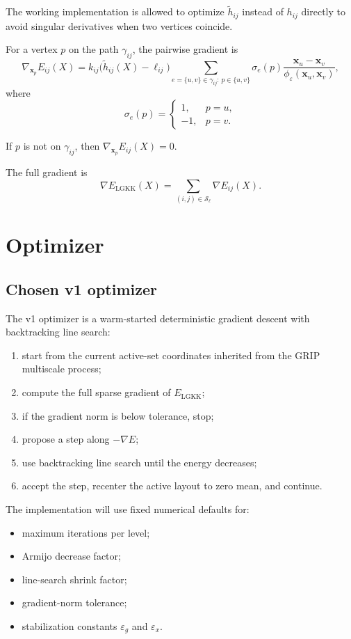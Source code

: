 \documentclass[11pt]{article}
\newcommand{\vect}[1]{\mathbf{#1}}
\begin{document}
The working implementation is allowed to optimize $\tilde{h}_{ij}$ instead of
$h_{ij}$ directly to avoid singular derivatives when two vertices coincide.

For a vertex $p$ on the path $\gamma_{ij}$, the pairwise gradient is
\[
\nabla_{\vect{x}_p} E_{ij}(X)
=
k_{ij}\bigl(\tilde{h}_{ij}(X)-\ell_{ij}\bigr)
\sum_{e=\{u,v\}\in\gamma_{ij}:\,p\in\{u,v\}}
\sigma_e(p)\frac{\vect{x}_u-\vect{x}_v}
{\phi_\varepsilon(\vect{x}_u,\vect{x}_v)},
\]
where
\[
\sigma_e(p)=
\begin{cases}
1, & p=u,\\
-1, & p=v.
\end{cases}
\]

If $p$ is not on $\gamma_{ij}$, then $\nabla_{\vect{x}_p}E_{ij}(X)=0$.

The full gradient is
\[
\nabla E_{\mathrm{LGKK}}(X)
=
\sum_{(i,j)\in\mathcal{S}_\ell} \nabla E_{ij}(X).
\]

\section{Optimizer}

\subsection{Chosen v1 optimizer}

The v1 optimizer is a warm-started deterministic gradient descent with
backtracking line search:
\begin{enumerate}[leftmargin=1.8em]
  \item start from the current active-set coordinates inherited from the GRIP
    multiscale process;
  \item compute the full sparse gradient of $E_{\mathrm{LGKK}}$;
  \item if the gradient norm is below tolerance, stop;
  \item propose a step along $-\nabla E$;
  \item use backtracking line search until the energy decreases;
  \item accept the step, recenter the active layout to zero mean, and continue.
\end{enumerate}

The implementation will use fixed numerical defaults for:
\begin{itemize}[leftmargin=1.4em]
  \item maximum iterations per level;
  \item Armijo decrease factor;
  \item line-search shrink factor;
  \item gradient-norm tolerance;
  \item stabilization constants $\varepsilon_g$ and $\varepsilon_x$.
\end{itemize}
\end{document}

